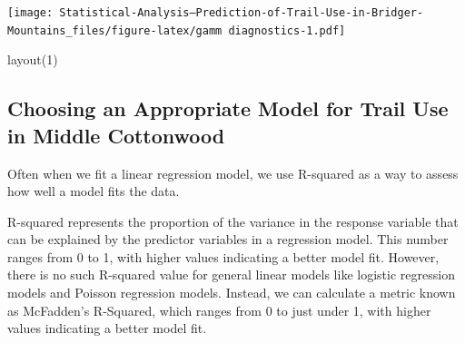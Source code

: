 \documentclass[
]{book}
\newenvironment{Shaded}{\begin{snugshade}}{\end{snugshade}}
\newcommand{\AttributeTok}[1]{\textcolor[rgb]{0.77,0.63,0.00}{#1}}
\newcommand{\DecValTok}[1]{\textcolor[rgb]{0.00,0.00,0.81}{#1}}
\newcommand{\FunctionTok}[1]{\textcolor[rgb]{0.00,0.00,0.00}{#1}}
\newcommand{\NormalTok}[1]{#1}
\newcommand{\SpecialCharTok}[1]{\textcolor[rgb]{0.00,0.00,0.00}{#1}}
\newcommand{\StringTok}[1]{\textcolor[rgb]{0.31,0.60,0.02}{#1}}
\begin{document}
\begin{Shaded}
\end{Shaded}

\texttt{[image: Statistical-Analysis--Prediction-of-Trail-Use-in-Bridger-Mountains\_files/figure-latex/gamm diagnostics-1.pdf]}

\begin{Shaded}
\begin{Highlighting}[]
\FunctionTok{layout}\NormalTok{(}\DecValTok{1}\NormalTok{)}
\end{Highlighting}
\end{Shaded}

\hypertarget{choosing-an-appropriate-model-for-trail-use-in-middle-cottonwood}{%
\subsection{Choosing an Appropriate Model for Trail Use in Middle Cottonwood}\label{choosing-an-appropriate-model-for-trail-use-in-middle-cottonwood}}

Often when we fit a linear regression model, we use R-squared as a way to assess how well a model fits the data.

R-squared represents the proportion of the variance in the response variable that can be explained by the predictor variables in a regression model. This number ranges from 0 to 1, with higher values indicating a better model fit. However, there is no such R-squared value for general linear models like logistic regression models and Poisson regression models. Instead, we can calculate a metric known as McFadden's R-Squared, which ranges from 0 to just under 1, with higher values indicating a better model fit.
\end{document}

